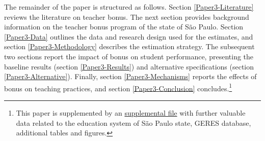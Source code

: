 \documentclass[a4paper, 12pt]{article}
\begin{document}
The remainder of the paper is structured as follows. Section \ref{Paper3-Literature} reviews the literature on teacher bonus. The next section provides background information on the teacher bonus program of the state of São Paulo. Section \ref{Paper3-Data} outlines the data and research design used for the estimates, and section \ref{Paper3-Methodology} describes the estimation strategy. The subsequent two sections report the impact of bonus on student performance, presenting the baseline results (section \ref{Paper3-Results}) and alternative specifications (section \ref{Paper3-Alternative}). Finally, section \ref{Paper3-Mechanisms} reports the effects of bonus on teaching practices, and section \ref{Paper3-Conclusion} concludes.\footnote{This paper is supplemented by an \hyperref[SuppMaterial]{supplemental file} with further valuable data related to the education system of São Paulo state, GERES database, additional tables and figures.}





\end{document}
